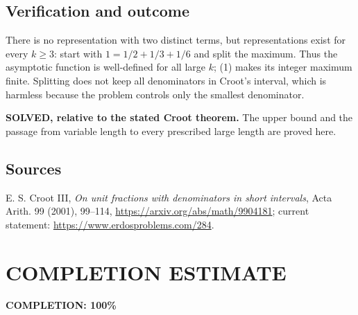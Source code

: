 \subsection{Verification and outcome}
There is no representation with two distinct terms, but representations exist for every $k\ge3$: start with $1=1/2+1/3+1/6$ and split the maximum. Thus the asymptotic function is well-defined for all large $k$; (1) makes its integer maximum finite. Splitting does not keep all denominators in Croot's interval, which is harmless because the problem controls only the smallest denominator.

\textbf{SOLVED, relative to the stated Croot theorem.} The upper bound and the passage from variable length to every prescribed large length are proved here.

\subsection{Sources}
E. S. Croot III, \emph{On unit fractions with denominators in short intervals}, Acta Arith. 99 (2001), 99--114, \url{https://arxiv.org/abs/math/9904181}; current statement: \url{https://www.erdosproblems.com/284}.
\section{COMPLETION ESTIMATE}
\textbf{COMPLETION: 100\%}
